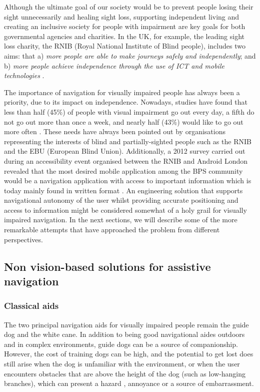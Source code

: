 Although the ultimate goal of our society would be to prevent people losing their sight unnecessarily and healing sight loss, supporting independent living and creating an inclusive society for people with impairment are key goals for both governmental agencies and charities. In the UK, for example, the leading sight loss charity, the RNIB (Royal National Institute of Blind people), includes two aims: that a) \textit{more people are able to make journeys safely and independently}; and b) \textit{more people achieve independence through the use of ICT and mobile technologies} \citep{RNIB2009}.

The importance of navigation for visually impaired people has always been a priority, due to its impact on independence. Nowadays, studies have found that less than half (45\%) of people with visual impairment go out every day, a fifth do not go out more than once a week, and nearly half (43\%) would like to go out more often \citep{douglas2006network}.  These needs have always been pointed out by organisations representing the interests of blind and partially-sighted people such as the RNIB and the EBU (European Blind Union). Additionally, a 2012 survey carried out during an accessibility event organised between the RNIB and Android London revealed that the most desired mobile application among the BPS community would be a navigation application with access to important information which is today mainly found in written format \citep{RNIB2012}. An engineering solution that supports navigational autonomy of the user whilst providing accurate positioning and access to information might be considered somewhat of a holy grail for visually impaired navigation. In the next sections, we will describe some of the more remarkable attempts that have approached the problem from different perspectives.




\subsection{Non vision-based solutions for assistive navigation}

\subsubsection{Classical aids}

The two principal navigation aids for visually impaired people remain the guide dog and the white cane.  In addition to being good navigational aides outdoors and in complex environments, guide dogs can be a source of companionship. However, the cost of training dogs can be high, and the potential to get lost does still arise when the dog is unfamiliar with the environment, or when the user encounters obstacles that are above the height of the dog (such as low-hanging branches), which can present a hazard \citep{manduchi2011mobility}, annoyance or a source of embarrassment. 


